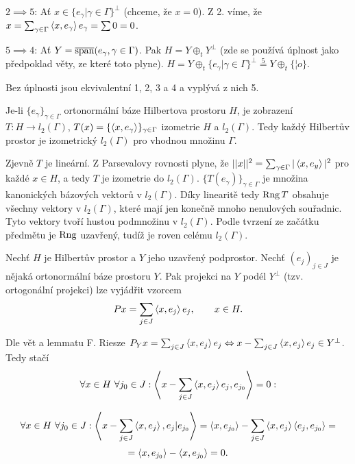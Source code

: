 \documentclass[12pt]{article}					%
\begin{document}
\begin{veta}
\begin{dukazin}
		$2 \implies 5$: Ať $x \in \{e_\gamma | \gamma \in \Gamma\}^{\perp}$ (chceme, že $x = 0$). Z 2. víme, že $x = \sum_{\gamma \in \Gamma}\left\langle x, e_\gamma\right\rangle e_\gamma = \sum 0 = 0$.

		$5 \implies 4$: Ať $Y = \overline{\operatorname{span}}(e_\gamma, \gamma \in \Gamma)$. Pak $H = Y \oplus_t Y^{\perp}$ (zde se používá úplnost jako předpoklad věty, ze které toto plyne). $H = Y \oplus_t \{e_\gamma | \gamma \in \Gamma\}^\perp \overset{5}{=} Y \oplus_t \{¦o\}$.
	\end{dukazin}

	\begin{poznamka}
		Bez úplnosti jsou ekvivalentní 1, 2, 3 a 4 a vyplývá z nich 5.
	\end{poznamka}
\end{veta}


\begin{veta}
	Je-li $\{e_\gamma\}_{\gamma \in \Gamma}$ ortonormální báze Hilbertova prostoru $H$, je zobrazení $T: H \rightarrow l_2(\Gamma)$, $T(x) = \{\left\langle x, e_\gamma\right\rangle\}_{\gamma \in \Gamma}$ izometrie $H$ a $l_2(\Gamma)$. Tedy každý Hilbertův prostor je izometrický $l_2(\Gamma)$ pro vhodnou množinu $\Gamma$.

	\begin{dukazin}[Ze skript]
		Zjevně $T$ je lineární. Z Parsevalovy rovnosti plyne, že $||x||^2 = \sum_{\gamma \in \Gamma} |\left\langle x, e_y\right\rangle|^2$ pro každé $x \in H$, a tedy $T$ je izometrie do $l_2(\Gamma)$. $\{T(e_\gamma)\}_{\gamma \in \Gamma}$ je množina kanonických bázových vektorů v $l_2(\Gamma)$. Díky linearitě tedy $\operatorname{Rng} T$ obsahuje všechny vektory v $l_2(\Gamma)$, které mají jen konečně mnoho nenulových souřadnic. Tyto vektory tvoří hustou podmnožinu v $l_2(\Gamma)$. Podle tvrzení ze začátku předmětu je $\operatorname{Rng}$ uzavřený, tudíž je roven celému $l_2(\Gamma)$.
	\end{dukazin}
\end{veta}

\begin{veta}
	Nechť $H$ je Hilbertův prostor a $Y$ jeho uzavřený podprostor. Nechť $(e_j)_{j \in J}$ je nějaká ortonormální báze prostoru $Y$. Pak projekci na $Y$ podél $Y^\perp$ (tzv. ortogonální projekci) lze vyjádřit vzorcem
	$$ Px = \sum_{j \in J}\left\langle x, e_j\right\rangle e_j, \qquad x \in H. $$

	\begin{dukazin}
		Dle vět a lemmatu F. Riesze $P_Y x = \sum_{j \in J}\left\langle x, e_j\right\rangle e_j \Leftrightarrow x - \sum_{j \in J} \left\langle x, e_j\right\rangle e_j \in Y^\perp$. Tedy stačí
		$$ \forall x \in H\ \forall j_0 \in J: \left\langle x - \sum_{j \in J}\left\langle x, e_j\right\rangle e_j, e_{j_0}\right\rangle = 0: $$

		$$ \forall x \in H\ \forall j_0 \in J: \left\langle x - \sum_{j \in J}\left\langle x, e_j\right\rangle, e_j | e_{j_0}\right\rangle = \left\langle x, e_{j_0}\right\rangle - \sum_{j \in J}\left\langle x, e_j\right\rangle\left\langle e_j, e_{j_0}\right\rangle = $$
		$$ = \left\langle x, e_{j_0}\right\rangle - \left\langle x, e_{j_0}\right\rangle = 0. $$
	\end{dukazin}
\end{veta}
\end{document}
